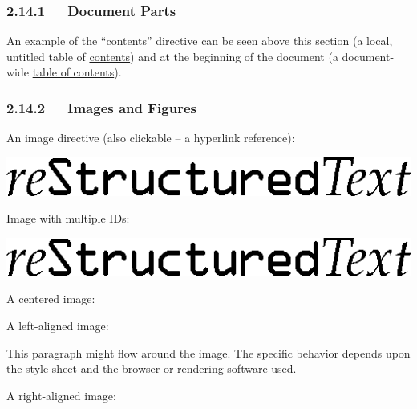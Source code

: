 \documentclass[a4paper]{article}
\begin{document}
\subsubsection{2.14.1   Document Parts%
  \label{document-parts}%
}

An example of the “contents” directive can be seen above this section
(a local, untitled table of \hyperref[contents]{contents}) and at the beginning of the
document (a document-wide \hyperref[table-of-contents]{table of contents}).


\subsubsection{2.14.2   Images and Figures%
  \label{images-and-figures}%
}

An image directive (also clickable – a hyperlink reference):

\hyperref[directives]{\includegraphics{../../../docs/user/rst/images/title.png}}

Image with multiple IDs:

\includegraphics{../../../docs/user/rst/images/title.png}
\label{image-target-3}\label{image-target-2}\label{image-target-1}

A centered image:

\noindent{}

A left-aligned image:


This paragraph might flow around the image.
The specific behavior depends upon the style sheet and
the browser or rendering software used.

A right-aligned image:

\end{document}
